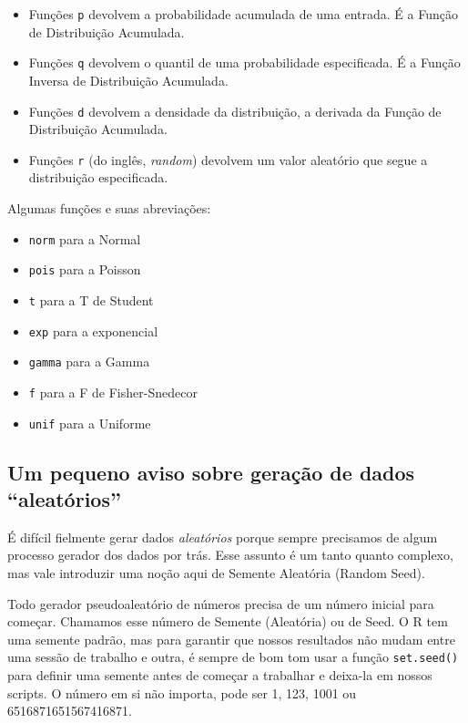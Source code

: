 \documentclass[]{article}
\providecommand{\tightlist}{%
  \setlength{\itemsep}{0pt}\setlength{\parskip}{0pt}}
\begin{document}
\begin{itemize}
\tightlist
\item
  Funções \texttt{p} devolvem a probabilidade acumulada de uma entrada.
  É a Função de Distribuição Acumulada.
\item
  Funções \texttt{q} devolvem o quantil de uma probabilidade
  especificada. É a Função Inversa de Distribuição Acumulada.
\item
  Funções \texttt{d} devolvem a densidade da distribuição, a derivada da
  Função de Distribuição Acumulada.
\item
  Funções \texttt{r} (do inglês, \emph{random}) devolvem um valor
  aleatório que segue a distribuição especificada.
\end{itemize}

Algumas funções e suas abreviações:

\begin{itemize}
\tightlist
\item
  \texttt{norm} para a Normal
\item
  \texttt{pois} para a Poisson
\item
  \texttt{t} para a T de Student
\item
  \texttt{exp} para a exponencial
\item
  \texttt{gamma} para a Gamma
\item
  \texttt{f} para a F de Fisher-Snedecor
\item
  \texttt{unif} para a Uniforme
\end{itemize}

\subsection{\texorpdfstring{Um pequeno aviso sobre geração de dados
``aleatórios''}{Um pequeno aviso sobre geração de dados aleatórios}}\label{um-pequeno-aviso-sobre-geracao-de-dados-aleatorios}

É difícil fielmente gerar dados \emph{aleatórios} porque sempre
precisamos de algum processo gerador dos dados por trás. Esse assunto é
um tanto quanto complexo, mas vale introduzir uma noção aqui de Semente
Aleatória (Random Seed).

Todo gerador pseudoaleatório de números precisa de um número inicial
para começar. Chamamos esse número de Semente (Aleatória) ou de Seed. O
R tem uma semente padrão, mas para garantir que nossos resultados não
mudam entre uma sessão de trabalho e outra, é sempre de bom tom usar a
função \texttt{set.seed()} para definir uma semente antes de começar a
trabalhar e deixa-la em nossos scripts. O número em si não importa, pode
ser 1, 123, 1001 ou 6516871651567416871.
\end{document}
